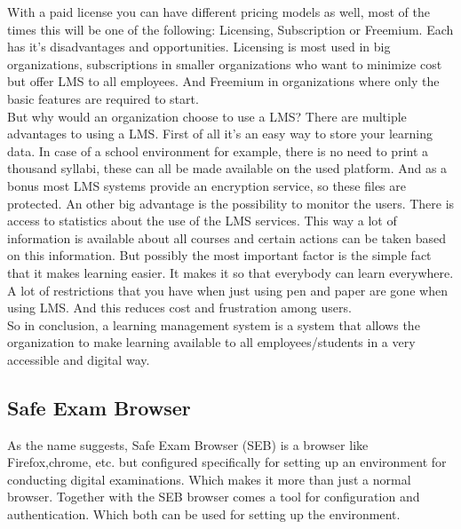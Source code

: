 With a paid license you can have different pricing models as well, most of the times this will be one of the following: Licensing, Subscription or Freemium. Each has it's disadvantages and opportunities. Licensing is most used in big organizations, subscriptions in smaller organizations who want to minimize cost but offer LMS to all employees. And Freemium in organizations where only the basic features are required to start.\\

But why would an organization choose to use a LMS? There are multiple advantages to using a LMS. First of all it's an easy way to store your learning data. In case of a school environment for example, there is no need to print a thousand syllabi, these can all be made available on the used platform. And as a bonus most LMS systems provide an encryption service, so these files are protected. An other big advantage is the possibility to monitor the users. There is access to statistics about the use of the LMS services. This way a lot of information is available about all courses and certain actions can be taken based on this information.
But possibly the most important factor is the simple fact that it makes learning easier. It makes it so that everybody can learn everywhere. A lot of restrictions that you have when just using pen and paper are gone when using LMS. And this reduces cost and frustration among users.\\

So in conclusion, a learning management system is a system that allows the organization to make learning available to all employees/students in a very accessible and digital way.

\subsection{Safe Exam Browser}
As the name suggests, Safe Exam Browser (SEB)  is a browser like Firefox,chrome, etc. but configured specifically for setting up an environment for conducting digital examinations. Which makes it more than just a normal browser. Together with the SEB browser comes a tool for configuration and authentication. Which both can be used for setting up the environment.\\

